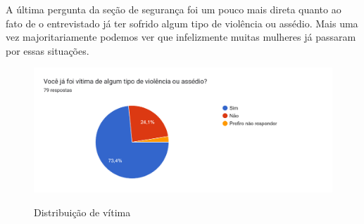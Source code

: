 A última pergunta da seção de segurança foi um pouco mais direta quanto ao fato de o entrevistado já ter sofrido algum tipo de violência ou assédio. Mais uma vez majoritariamente podemos ver que infelizmente muitas mulheres já passaram por essas situações. 
\begin{figure}[h]
  \begin{center}
  \includegraphics[width=1.0\linewidth]{images/distribuicao-vitma.png}\\
  \end{center}
  \caption[Distribuição de vítima]{Distribuição de vítima}
  \label{fig:mapa-empatia=inicial}
\end{figure}